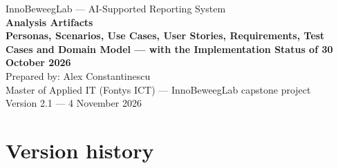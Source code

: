 \documentclass[11pt,a4paper]{article}
\begin{document}
\begin{titlepage}
\centering
\vspace*{1.5cm}
{\small InnoBeweegLab --- AI-Supported Reporting System}\\[1.2cm]
{\color{navy}\Huge\bfseries Analysis Artifacts}\\[0.7cm]
{\color{teal}\Large\bfseries Personas, Scenarios, Use Cases, User Stories, Requirements, Test Cases and Domain Model --- with the Implementation Status of 30 October 2026}\\[1.8cm]
{\large Prepared by: Alex Constantinescu}\\[0.3cm]
{\large Master of Applied IT (Fontys ICT) --- InnoBeweegLab capstone project}\\[0.3cm]
{\large Version 2.1 --- 4 November 2026}
\vfill
\end{titlepage}

\section*{Version history}


\clearpage
\tableofcontents

\clearpage
{}


\clearpage

\clearpage

\clearpage

\clearpage

\clearpage

\clearpage

\clearpage

\clearpage

\end{document}
